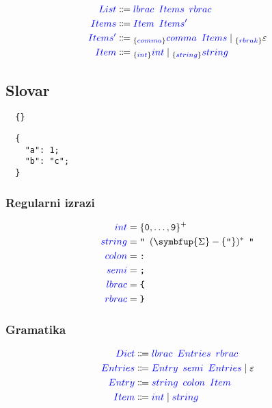 \documentclass{article}
\newcommand{\Symbol}[1]{\textcolor{blue}{#1}}
\newcommand{\Alphabet}{\symbfup{\Sigma}}
\newcommand{\Null}{\varepsilon}
\newcommand{\Char}[1]{\texttt{#1}}
\newcommand{\Arrow}{\Coloneq}
\newcommand{\Seq}{{\ \,}}
\newcommand{\Union}{\mathrel{|}}
\newcommand{\Kleene}[1]{#1^\ast}
\newcommand{\KleenePlus}[1]{#1^+}
\newcommand{\Lookahead}[1]{{}_{\{{#1}\}}}
\begin{document}
\begin{equation*}
  \begin{aligned}
    \Symbol{List} &\Arrow \Symbol{lbrac} \Seq \Symbol{Items} \Seq \Symbol{rbrac}\\
    \Symbol{Items} &\Arrow \Symbol{Item} \Seq \Symbol{Items'}\\
    \Symbol{Items'} &\Arrow \Lookahead{\Symbol{comma}} \Symbol{comma} \Seq \Symbol{Items} \Union \Lookahead{\Symbol{rbrak}} \Null\\
    \Symbol{Item} &\Arrow \Lookahead{\Symbol{int}} \Symbol{int} \Union \Lookahead{\Symbol{string}} \Symbol{string}
  \end{aligned}
\end{equation*}

\subsection{Slovar}
\begin{verbatim}
  {}
\end{verbatim}
\begin{verbatim}
  {
    "a": 1;
    "b": "c";
  }
\end{verbatim}

\subsubsection*{Regularni izrazi}
\begin{equation*}
  \begin{aligned}
    \Symbol{int} &= \KleenePlus{\{\Char{0}, \dots, \Char{9}\}}\\
    \Symbol{string} &= \Char{"} \Seq \Kleene{(\Alphabet - \{\Char{"}\})} \Seq \Char{"}\\
    \Symbol{colon} &= \Char{:}\\
    \Symbol{semi} &= \Char{;}\\
    \Symbol{lbrac} &= \Char{\{}\\
    \Symbol{rbrac} &= \Char{\}}\\
  \end{aligned}
\end{equation*}

\subsubsection*{Gramatika}
\begin{equation*}
  \begin{aligned}
    \Symbol{Dict} &\Arrow \Symbol{lbrac} \Seq \Symbol{Entries} \Seq \Symbol{rbrac}\\
    \Symbol{Entries} &\Arrow \Symbol{Entry} \Seq \Symbol{semi} \Seq \Symbol{Entries} \Union \Null\\
    \Symbol{Entry} &\Arrow \Symbol{string} \Seq \Symbol{colon} \Seq \Symbol{Item}\\
    \Symbol{Item} &\Arrow \Symbol{int} \Union \Symbol{string}
  \end{aligned}
\end{equation*}
\end{document}
